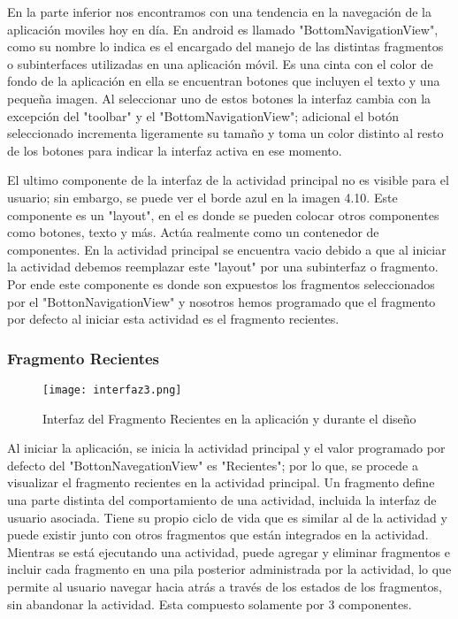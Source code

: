 \par \noindent
En la parte inferior nos encontramos con una tendencia en la navegación de la aplicación moviles hoy en día. En android es llamado "BottomNavigationView", como su nombre lo indica es el encargado del manejo de las distintas fragmentos o subinterfaces utilizadas en una aplicación móvil. Es una cinta con el color de fondo de la aplicación en ella se encuentran botones que incluyen el texto y una pequeña imagen. Al seleccionar uno de estos botones la interfaz cambia con la excepción del "toolbar" y el "BottomNavigationView"; adicional el botón seleccionado incrementa ligeramente su tamaño y toma un color distinto al resto de los botones para indicar la interfaz activa en ese momento.

\par \noindent
El ultimo componente de la interfaz de la actividad principal no es visible para el usuario; sin embargo, se puede ver el borde azul en la imagen 4.10. Este componente es un "layout", en el es donde se pueden colocar otros componentes como botones, texto y más. Actúa realmente como un contenedor de componentes. En la actividad principal se encuentra vacio debido a que al iniciar la actividad debemos reemplazar este "layout" por una subinterfaz o fragmento. Por ende este componente es donde son expuestos los fragmentos seleccionados por el "BottonNavigationView" y nosotros hemos programado que el fragmento por defecto al iniciar esta actividad es el fragmento recientes.

\subsubsection{Fragmento Recientes}

\begin{figure}[H]
	\centering
	\texttt{[image: interfaz3.png]}
	\caption{Interfaz del Fragmento Recientes en la aplicación y durante el diseño}
\end{figure}

\par \noindent
Al iniciar la aplicación, se inicia la actividad principal y el valor programado por defecto del "BottonNavegationView" es "Recientes"; por lo que, se procede a visualizar el fragmento recientes en la actividad principal. Un fragmento define una parte distinta del comportamiento de una actividad, incluida la interfaz de usuario asociada. Tiene su propio ciclo de vida que es similar al de la actividad y puede existir junto con otros fragmentos que están integrados en la actividad. Mientras se está ejecutando una actividad, puede agregar y eliminar fragmentos e incluir cada fragmento en una pila posterior administrada por la actividad, lo que permite al usuario navegar hacia atrás a través de los estados de los fragmentos, sin abandonar la actividad\cite{androidapp}. Esta compuesto solamente por 3 componentes. 

